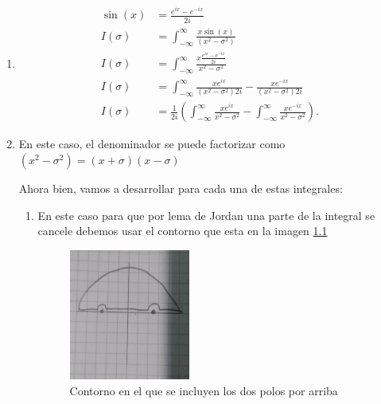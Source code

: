 \documentclass{report}
\begin{document}
  \chapter{}
  \begin{enumerate}
    \item 
      \begin{align*}
        \sin\left( x \right) &= \frac{e^{ix}-e^{-ix}}{2i} \\
	I\left( \sigma \right) &= \int_{-\infty}^{\infty}\frac{x\sin\left( x \right) }{\left( x^2-\sigma^2 \right) } \\
	I\left( \sigma \right) &= \int_{-\infty}^{\infty} \frac{x \frac{e^{ix}-e^{-ix}}{2i}}{x^2-\sigma^2} \\
	I\left( \sigma \right) &= \int_{-\infty}^{\infty} \frac{x e^{ix}}{\left( x^2-\sigma^2 \right)2i}-\frac{x e^{-ix}}{\left( x^2-\sigma^2 \right) 2i} \\
	I\left( \sigma\right) &= \frac{1}{2i}\left( \int_{-\infty}^{\infty}\frac{xe^{ix}}{x^2-\sigma^2}-\int_{-\infty}^{\infty}\frac{xe^{-ix}}{x^2-\sigma^2} \right) 
      .\end{align*}
    \item En este caso, el denominador se puede factorizar como $\left( x^2-\sigma^2 \right) = \left( x+\sigma \right) \left( x-\sigma \right) $

      Ahora bien, vamos a desarrollar para cada una de estas integrales:
      \begin{enumerate}
	\item En este caso para que por lema de Jordan una parte de la integral se cancele debemos usar el contorno que esta en la imagen \ref{fig:contornoa}
	  \begin{figure}[h]
	    \centering
	    \includegraphics[width=0.4\textwidth]{Graficas/contorno_a.jpeg}
	    \caption{Contorno en el que se incluyen los dos polos por arriba}
	    \label{fig:contornoa}
	  \end{figure}


\end{enumerate}
\end{enumerate}
\end{document}
